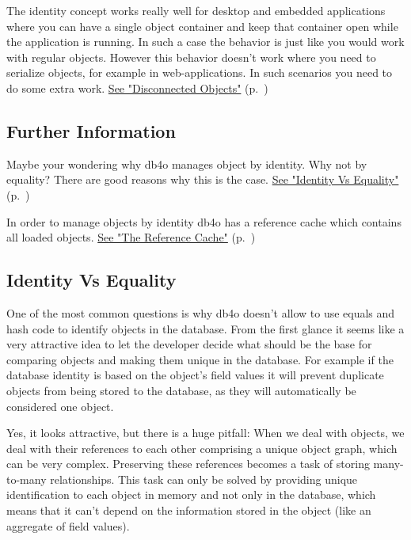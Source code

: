 The identity concept works really well for desktop and embedded applications where you can have a single object container and keep that container open while the application is running. In such a case the behavior is just like you would work with regular objects. However this behavior doesn't work where you need to serialize objects, for example in web-applications. In such scenarios you need to do some extra work. \hyperref[ref:platform-specific-issues-disconnected-objects]{See "Disconnected Objects"} (p.~\pageref{ref:platform-specific-issues-disconnected-objects})

\subsection*{Further Information}

Maybe your wondering why db4o manages object by identity. Why not by equality? There are good reasons why this is the case. \hyperref[ref:basics-indentity-concept-identity-vs-equals]{See "Identity Vs Equality"} (p.~\pageref{ref:basics-indentity-concept-identity-vs-equals})

In order to manage objects by identity db4o has a reference cache which contains all loaded objects. \hyperref[ref:basics-indentity-concept-reference-cache]{See "The Reference Cache"} (p.~\pageref{ref:basics-indentity-concept-reference-cache})

\subsection{Identity Vs Equality}
\label{ref:basics-indentity-concept-identity-vs-equals}

One of the most common questions is why db4o doesn't allow to use equals and hash code to identify objects in the database. From the first glance it seems like a very attractive idea to let the developer decide what should be the base for comparing objects and making them unique in the database. For example if the database identity is based on the object's field values it will prevent duplicate objects from being stored to the database, as they will automatically be considered one object.

Yes, it looks attractive, but there is a huge pitfall: When we deal with objects, we deal with their references to each other comprising a unique object graph, which can be very complex. Preserving these references becomes a task of storing many-to-many relationships. This task can only be solved by providing unique identification to each object in memory and not only in the database, which means that it can't depend on the information stored in the object (like an aggregate of field values).


